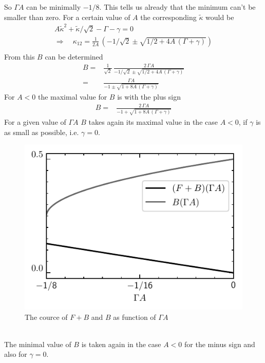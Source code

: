 \documentclass{article}
\begin{document}
So $\Gamma A$ can be minimally $-1/8$. This tells us already that the minimum can't be smaller than zero. For a certain value of $A$ the corresponding $\tilde{\kappa}$ would be
\begin{align*}
    A\tilde{\kappa}^2+\tilde{\kappa}/\sqrt{2}-\Gamma-\gamma=0\\
    \Rightarrow\quad \kappa_{12}=\frac{1}{2A}\,\left(-1/\sqrt{2}\pm\sqrt{1/2+4A\,(\Gamma+\gamma)}\right)\\
\end{align*}
From this $B$ can be determined
\begin{align*}
    B=&\frac{1}{\sqrt{2}}\,\frac{2\,\Gamma A}{-1/\sqrt{2}\pm\sqrt{1/2+4A\,(\Gamma+\gamma)}}\\
    =&\frac{\Gamma A}{-1\pm\sqrt{1+8A\,(\Gamma+\gamma)}}
\end{align*}
For $A<0$ the maximal value for $B$ is with the plus sign
\begin{align*}
    B=&\frac{2\,\Gamma A}{-1+\sqrt{1+8A\,(\Gamma+\gamma)}}
\end{align*}
For a given value of $\Gamma A$ $B$ takes again its maximal value in the case $A<0$, if $\gamma$ is as small as possible, i.e. $\gamma=0$.
\begin{figure}
    \includegraphics{pictures/k=w_F|B_numn_of_fixp.pdf}
    \vspace*{-2cm}\caption{The cource of $F+B$ and $B$ as function of $\Gamma A$}
    \label{fig:k=w_numb_of_fixp}
\end{figure}\\
The minimal value of $B$ is taken again in the case $A<0$ for the minus sign and also for $\gamma=0$.\\
\end{document}
